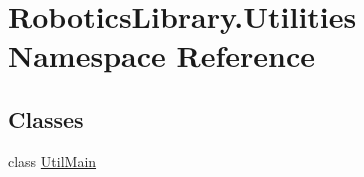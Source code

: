 \hypertarget{namespace_robotics_library_1_1_utilities}{}\section{Robotics\+Library.\+Utilities Namespace Reference}
\label{namespace_robotics_library_1_1_utilities}
\subsection*{Classes}
\begin{DoxyCompactItemize}
\item 
class \hyperlink{class_robotics_library_1_1_utilities_1_1_util_main}{Util\+Main}
\end{DoxyCompactItemize}
